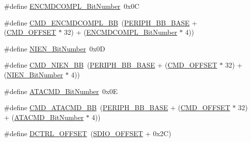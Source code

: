 \begin{DoxyCompactItemize}
\item 
\#define \hyperlink{group___s_d_i_o___private___types_definitions_ga1d1112c7b804791a0fffd8b317085aeb}{E\+N\+C\+M\+D\+C\+O\+M\+P\+L\+\_\+\+Bit\+Number}~0x0C
\item 
\#define \hyperlink{group___s_d_i_o___private___types_definitions_gade06098d1616639ce5f1b70675280b7c}{C\+M\+D\+\_\+\+E\+N\+C\+M\+D\+C\+O\+M\+P\+L\+\_\+\+BB}~(\hyperlink{group___peripheral__memory__map_gaed7efc100877000845c236ccdc9e144a}{P\+E\+R\+I\+P\+H\+\_\+\+B\+B\+\_\+\+B\+A\+SE} + (\hyperlink{group___s_d_i_o___private___types_definitions_gaf12d26702ce7a88d2a3dae87f000b75e}{C\+M\+D\+\_\+\+O\+F\+F\+S\+ET} $\ast$ 32) + (\hyperlink{group___s_d_i_o___private___types_definitions_ga1d1112c7b804791a0fffd8b317085aeb}{E\+N\+C\+M\+D\+C\+O\+M\+P\+L\+\_\+\+Bit\+Number} $\ast$ 4))
\item 
\#define \hyperlink{group___s_d_i_o___private___types_definitions_gab6d83a7ccd4a0d9ea9a09fec263fb25f}{N\+I\+E\+N\+\_\+\+Bit\+Number}~0x0D
\item 
\#define \hyperlink{group___s_d_i_o___private___types_definitions_ga08623f1d053677de8b20a6f5f5090edd}{C\+M\+D\+\_\+\+N\+I\+E\+N\+\_\+\+BB}~(\hyperlink{group___peripheral__memory__map_gaed7efc100877000845c236ccdc9e144a}{P\+E\+R\+I\+P\+H\+\_\+\+B\+B\+\_\+\+B\+A\+SE} + (\hyperlink{group___s_d_i_o___private___types_definitions_gaf12d26702ce7a88d2a3dae87f000b75e}{C\+M\+D\+\_\+\+O\+F\+F\+S\+ET} $\ast$ 32) + (\hyperlink{group___s_d_i_o___private___types_definitions_gab6d83a7ccd4a0d9ea9a09fec263fb25f}{N\+I\+E\+N\+\_\+\+Bit\+Number} $\ast$ 4))
\item 
\#define \hyperlink{group___s_d_i_o___private___types_definitions_gabd4fd3bb700b879f843ccc867db1832e}{A\+T\+A\+C\+M\+D\+\_\+\+Bit\+Number}~0x0E
\item 
\#define \hyperlink{group___s_d_i_o___private___types_definitions_gabb7e537f931b6fdd3b49e826f2e19d7c}{C\+M\+D\+\_\+\+A\+T\+A\+C\+M\+D\+\_\+\+BB}~(\hyperlink{group___peripheral__memory__map_gaed7efc100877000845c236ccdc9e144a}{P\+E\+R\+I\+P\+H\+\_\+\+B\+B\+\_\+\+B\+A\+SE} + (\hyperlink{group___s_d_i_o___private___types_definitions_gaf12d26702ce7a88d2a3dae87f000b75e}{C\+M\+D\+\_\+\+O\+F\+F\+S\+ET} $\ast$ 32) + (\hyperlink{group___s_d_i_o___private___types_definitions_gabd4fd3bb700b879f843ccc867db1832e}{A\+T\+A\+C\+M\+D\+\_\+\+Bit\+Number} $\ast$ 4))
\item 
\#define \hyperlink{group___s_d_i_o___private___types_definitions_ga948c1382c4cfd3af3e406c4d0cdd4240}{D\+C\+T\+R\+L\+\_\+\+O\+F\+F\+S\+ET}~(\hyperlink{group___s_d_i_o___private___types_definitions_gabf07aced03df5f46d57cea1d4f56d1e3}{S\+D\+I\+O\+\_\+\+O\+F\+F\+S\+ET} + 0x2\+C)

\end{DoxyCompactItemize}
